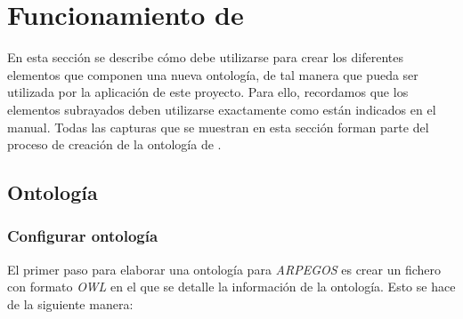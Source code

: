 
\section{Funcionamiento de \protege}
En esta sección se describe cómo debe utilizarse \protege para crear los diferentes elementos que componen una nueva ontología,
de tal manera que pueda ser utilizada por la aplicación de este proyecto. Para ello, recordamos que los elementos subrayados 
deben utilizarse exactamente como están indicados en el manual. Todas las capturas que se muestran en esta sección forman 
parte del proceso de creación de la ontología de \anima. 

\subsection{Ontología}
\subsubsection{Configurar ontología}
El primer paso para elaborar una ontología para \textit{ARPEGOS} es crear un fichero con formato \textit{OWL} en el que 
se detalle la información de la ontología. Esto se hace de la siguiente manera: 

